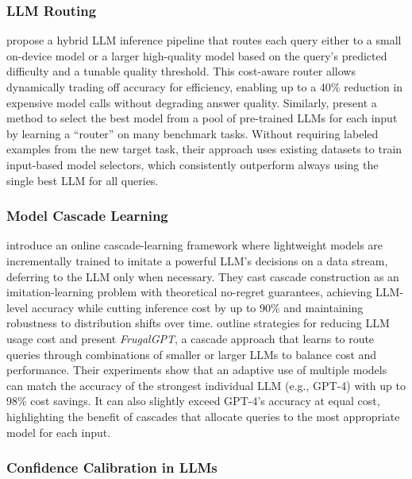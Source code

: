 \subsubsection{LLM Routing}
\citet{ding2024hybrid} propose a hybrid LLM inference pipeline that routes each query either to a small on-device model or a larger high-quality model based on the query’s predicted difficulty and a tunable quality threshold. This cost-aware router allows dynamically trading off accuracy for efficiency, enabling up to a 40\% reduction in expensive model calls without degrading answer quality. Similarly, \citet{shnitzer2023large} present a method to select the best model from a pool of pre-trained LLMs for each input by learning a “router” on many benchmark tasks. Without requiring labeled examples from the new target task, their approach uses existing datasets to train input-based model selectors, which consistently outperform always using the single best LLM for all queries. 

\subsubsection{Model Cascade Learning}
\citet{nie2024online} introduce an online cascade-learning framework where lightweight models are incrementally trained to imitate a powerful LLM’s decisions on a data stream, deferring to the LLM only when necessary. They cast cascade construction as an imitation-learning problem with theoretical no-regret guarantees, achieving LLM-level accuracy while cutting inference cost by up to 90\% and maintaining robustness to distribution shifts over time. \citet{chen2023frugalgpt} outline strategies for reducing LLM usage cost and present \emph{FrugalGPT}, a cascade approach that learns to route queries through combinations of smaller or larger LLMs to balance cost and performance. Their experiments show that an adaptive use of multiple models can match the accuracy of the strongest individual LLM (e.g., GPT-4) with up to 98\% cost savings. It can also slightly exceed GPT-4’s accuracy at equal cost, highlighting the benefit of cascades that allocate queries to the most appropriate model for each input. 

\subsubsection{Confidence Calibration in LLMs}

